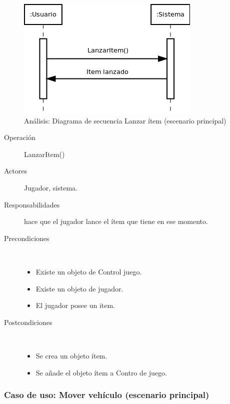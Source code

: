\begin{figure}[H] 
  \label{secuencia_lanzar_item}
  \begin{center}
    \includegraphics[scale=0.6]{imagenes/analisis/secuencia_lanzar_item.png}
  \end{center}
  \caption{Análisis: Diagrama de secuencia Lanzar ítem (escenario principal)}
\end{figure}

\begin{description}
    \item [Operación] LanzarItem()
    \item [Actores] Jugador, sistema.
    \item [Responsabilidades] hace que el jugador lance el ítem que tiene en ese momento.
    \item [Precondiciones] $\quad$
        \begin{itemize}
            \item Existe un objeto de Control juego.
            \item Existe un objeto de jugador.
            \item El jugador posee un item.
        \end{itemize}
    \item [Postcondiciones] $\quad$
        \begin{itemize}
            \item Se crea un objeto ítem.
            \item Se añade el objeto ítem a Contro de juego.
        \end{itemize}
\end{description}

\subsubsection{Caso de uso: Mover vehículo (escenario principal)}

